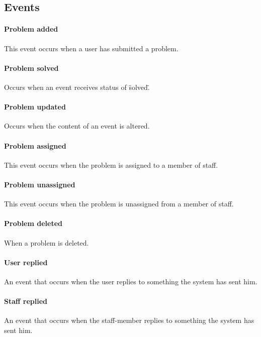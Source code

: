 
\subsection{Events}

\paragraph{Problem added}
This event occurs when a user has submitted a problem.

\paragraph{Problem solved}
Occurs when an event receives status of \"solved\".

\paragraph{Problem updated}
Occurs when the content of an event is altered.

\paragraph{Problem assigned}
This event occurs when the problem is assigned to a member of staff.

\paragraph{Problem unassigned}
This event occurs when the problem is unassigned from a member of staff.

\paragraph{Problem deleted}
When a problem is deleted. 

\paragraph{User replied}
An event that occurs when the user replies to something the system has sent him.

\paragraph{Staff replied}
An event that occurs when the staff-member replies to something the system has sent him.

